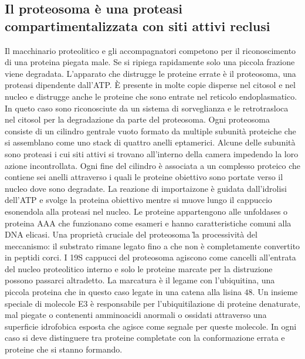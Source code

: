 \subsection{Il proteosoma \`e una proteasi compartimentalizzata con siti attivi reclusi}
Il macchinario proteolitico e gli accompagnatori competono per il riconoscimento di una proteina piegata male. Se si ripiega rapidamente solo una piccola frazione viene degradata. 
L'apparato che distrugge le proteine errate \`e il proteosoma, una proteasi dipendente dall'ATP. \`E presente in molte copie disperse nel citosol e nel nucleo e distrugge anche le 
proteine che sono entrate nel reticolo endoplasmatico. In queto caso sono riconosciute da un sistema di sorveglianza e le retrotrasloca nel citosol per la degradazione da parte del
proteosoma. Ogni proteosoma consiste di un cilindro gentrale vuoto formato da multiple subunit\`a proteiche che si assemblano come uno stack di quattro anelli eptamerici. Alcune delle
subunit\`a sono proteasi i cui siti attivi si trovano all'interno della camera impedendo la loro azione incontrollata. Ogni fine del cilindro \`e associata a un complesso proteico che
contiene sei anelli attraverso i quali le proteine obiettivo sono portate verso il nucleo dove sono degradate. La reazione di importaizone \`e guidata dall'idrolisi dell'ATP e svolge
la proteina obiettivo mentre si muove lungo il cappuccio esonendola alla proteasi nel nucleo. Le proteine appartengono alle unfoldases o proteina AAA che funzionano come esameri
e hanno caratteristiche comuni alla DNA elicasi. Una propriet\`a cruciale del proteosoma \` la processivit\`a del meccanismo: il substrato rimane legato fino a che non \`e completamente
convertito in peptidi corci. I 19S cappucci del proteosoma agiscono come cancelli all'entrata del nucleo proteolitico interno e solo le proteine marcate per la distruzione possono
passarci altradetto. La marcatura \`e il legame con l'ubiquitina, una piccola proteina che in questo caso legate in una catena alla lisina $48$. Un insieme speciale di molecole E3 \`e
responsabile per l'ubiquitilazione di proteine denaturate, mal piegate o contenenti amminoacidi anormali o ossidati attraverso una superficie idrofobica esposta che agisce come segnale
per queste molecole. In ogni caso si deve distinguere tra proteine completate con la conformazione errata e proteine che si stanno formando.
